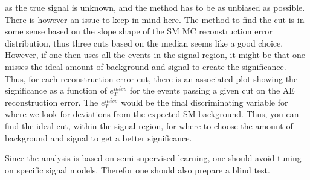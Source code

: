 as the true signal is unknown, and the method has to be as unbiased as possible. There is however an issue to keep 
in mind here. The method to find the cut is in some sense based on the slope shape of the SM MC reconstruction 
error distribution, thus three cuts based on the median seems like a good choice. However, if one then uses all 
the events in the signal region, it might be that one misses the ideal amount of background and signal to create 
the significance. Thus, for each reconstruction error cut, there is an associated plot showing the significance 
as a function of $e_T^{miss}$ for the events passing a given cut on the AE reconstruction error. The $e_T^{miss}$
would be the final discriminating variable for where we look for deviations from the expected SM background. 
Thus, you can find the ideal cut, within the signal region, for where to 
choose the amount of background and signal to get a better significance.\par 
Since the analysis is based on semi supervised learning, one should avoid tuning on specific signal models.
Therefor one should also prepare a blind test. 
